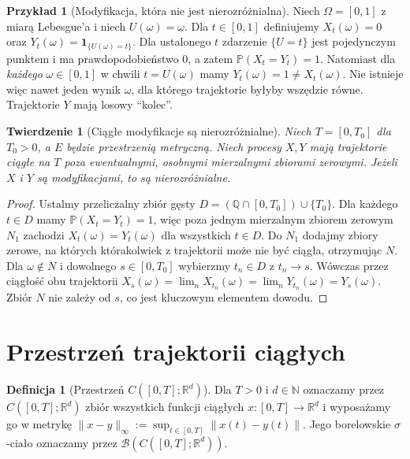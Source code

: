 \documentclass[11pt,a4paper,oneside]{report}
\numberwithin{equation}{chapter}
\theoremstyle{plain}
\newtheorem{twierdzenie}{Twierdzenie}[chapter]
\theoremstyle{definition}
\newtheorem{definicja}{Definicja}[chapter]
\newtheorem{przyklad}{Przykład}[chapter]
\theoremstyle{remark}
\newcommand{\R}{\mathbb{R}}
\newcommand{\N}{\mathbb{N}}
\newcommand{\Q}{\mathbb{Q}}
\newcommand{\Prob}{\mathbb{P}}
\newcommand{\calB}{\mathcal{B}}
\newcommand{\ind}[1]{\mathbf{1}_{#1}}
\newcommand{\norm}[1]{\lVert #1\rVert}
\begin{document}
\begin{przyklad}[Modyfikacja, która nie jest nierozróżnialna]
Niech $\Omega=[0,1]$ z miarą Lebesgue'a i niech
$U(\omega)=\omega$. Dla $t\in[0,1]$ definiujemy
$X_t(\omega)=0$ oraz $Y_t(\omega)=\ind{\{U(\omega)=t\}}$.
Dla ustalonego $t$ zdarzenie $\{U=t\}$ jest pojedynczym
punktem i ma prawdopodobieństwo $0$, a zatem
$\Prob(X_t=Y_t)=1$. Natomiast dla \emph{każdego}
$\omega\in[0,1]$ w chwili $t=U(\omega)$ mamy
$Y_t(\omega)=1\ne X_t(\omega)$. Nie istnieje więc
nawet jeden wynik $\omega$, dla którego trajektorie byłyby
wszędzie równe. Trajektorie $Y$ mają losowy ``kolec''.
\end{przyklad}

\begin{twierdzenie}[Ciągłe modyfikacje są nierozróżnialne]
Niech $T=[0,T_0]$ dla $T_0>0$, a $E$ będzie przestrzenią
metryczną. Niech procesy $X,Y$ mają trajektorie ciągłe na $T$
poza ewentualnymi, osobnymi mierzalnymi zbiorami zerowymi.
Jeżeli $X$ i $Y$ są modyfikacjami, to są nierozróżnialne.
\end{twierdzenie}
\begin{proof}
Ustalmy przeliczalny zbiór gęsty
$D=(\Q\cap[0,T_0])\cup\{T_0\}$.
Dla każdego $t\in D$ mamy $\Prob(X_t=Y_t)=1$,
więc poza jednym mierzalnym zbiorem zerowym $N_1$
zachodzi $X_t(\omega)=Y_t(\omega)$ dla wszystkich $t\in D$.
Do $N_1$ dodajmy zbiory zerowe, na których którakolwiek z
trajektorii może nie być ciągła, otrzymując $N$.
Dla $\omega\notin N$ i dowolnego $s\in[0,T_0]$
wybierzmy $t_n\in D$ z $t_n\to s$.
Wówczas przez ciągłość obu trajektorii
$X_s(\omega)=\lim_n X_{t_n}(\omega)
=\lim_n Y_{t_n}(\omega)=Y_s(\omega)$.
Zbiór $N$ nie zależy od $s$, co jest kluczowym elementem dowodu.
\end{proof}

\section{Przestrzeń trajektorii ciągłych}
\begin{definicja}[{Przestrzeń $C([0,T];\R^d)$}]
Dla $T>0$ i $d\in\N$ oznaczamy przez
$C([0,T];\R^d)$ zbiór wszystkich funkcji ciągłych
$x:[0,T]\to\R^d$ i wyposażamy go w metrykę
$\norm{x-y}_\infty:=\sup_{t\in[0,T]}\norm{x(t)-y(t)}$.
Jego borelowskie $\sigma$-ciało oznaczamy przez
$\calB(C([0,T];\R^d))$.
\end{definicja}
\end{document}

